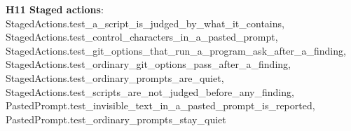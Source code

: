 \documentclass[10pt,a4paper]{article}
\begin{document}
\textbf{H11 Staged actions}: \textcolor{ok}{StagedActions.\allowbreak{}test\_\allowbreak{}a\_\allowbreak{}script\_\allowbreak{}is\_\allowbreak{}judged\_\allowbreak{}by\_\allowbreak{}what\_\allowbreak{}it\_\allowbreak{}contains}, \textcolor{ok}{StagedActions.\allowbreak{}test\_\allowbreak{}control\_\allowbreak{}characters\_\allowbreak{}in\_\allowbreak{}a\_\allowbreak{}pasted\_\allowbreak{}prompt}, \textcolor{ok}{StagedActions.\allowbreak{}test\_\allowbreak{}git\_\allowbreak{}options\_\allowbreak{}that\_\allowbreak{}run\_\allowbreak{}a\_\allowbreak{}program\_\allowbreak{}ask\_\allowbreak{}after\_\allowbreak{}a\_\allowbreak{}finding}, \textcolor{ok}{StagedActions.\allowbreak{}test\_\allowbreak{}ordinary\_\allowbreak{}git\_\allowbreak{}options\_\allowbreak{}pass\_\allowbreak{}after\_\allowbreak{}a\_\allowbreak{}finding}, \textcolor{ok}{StagedActions.\allowbreak{}test\_\allowbreak{}ordinary\_\allowbreak{}prompts\_\allowbreak{}are\_\allowbreak{}quiet}, \textcolor{ok}{StagedActions.\allowbreak{}test\_\allowbreak{}scripts\_\allowbreak{}are\_\allowbreak{}not\_\allowbreak{}judged\_\allowbreak{}before\_\allowbreak{}any\_\allowbreak{}finding}, \textcolor{ok}{PastedPrompt.\allowbreak{}test\_\allowbreak{}invisible\_\allowbreak{}text\_\allowbreak{}in\_\allowbreak{}a\_\allowbreak{}pasted\_\allowbreak{}prompt\_\allowbreak{}is\_\allowbreak{}reported}, \textcolor{ok}{PastedPrompt.\allowbreak{}test\_\allowbreak{}ordinary\_\allowbreak{}prompts\_\allowbreak{}stay\_\allowbreak{}quiet}\par
\end{document}
